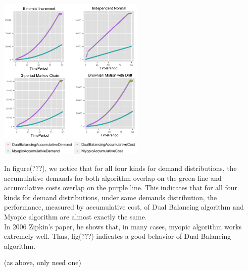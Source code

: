 \documentclass[twoside]{article}
\begin{document}
\begin{multicols}{2}
\begin{center}
  \includegraphics[width=2.8in]{figures/AccumulativeDemandAndCost.png}
  \includegraphics[width=2.8in]{figures/key.png}
\end{center}

In figure(???), we notice that for all four kinds for demand distributions, the accumulative demands for both algorithm overlap on the green line and accumulative costs overlap on the purple line. This indicates that for all four kinds for demand distributions, under same demands distribution, the performance, measured by accumulative cost, of Dual Balancing algorithm and Myopic algorithm are almost exactly the same.\\
In 2006 Zipkin's paper\cite{CLAcha1}, he shows that, in many cases, myopic algorithm works extremely well. Thus, fig(???) indicates a good behavior of Dual Balancing algorithm.


(as above, only need one)



\end{multicols}
\end{document}
